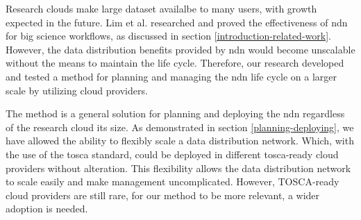 








Research clouds make large dataset availalbe to many users, with growth expected in the future. Lim et al. researched and proved the effectiveness of \gls{ndn} for big science workflows, as discussed in section \ref{introduction-related-work}. However, the data distribution benefits provided by \gls{ndn} would become unscalable without the means to maintain the life cycle. Therefore, our research developed and tested a method for planning and managing the \gls{ndn} life cycle on a larger scale by utilizing cloud providers.

The method is a general solution for planning and deploying the \gls{ndn} regardless of the research cloud its size. As demonstrated in section \ref{planning-deploying}, we have allowed the ability to flexibly scale a data distribution network. Which, with the use of the \gls{tosca} standard, could be deployed in different \gls{tosca}-ready cloud providers without alteration. This flexibility allows the data distribution network to scale easily and make management uncomplicated. However, TOSCA-ready cloud providers are still rare, for our method to be more relevant, a wider adoption is needed.

